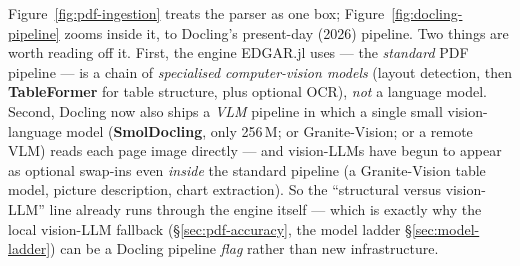 \documentclass[11pt,a4paper]{report}
\begin{document}
Figure~\ref{fig:pdf-ingestion} treats the parser as one box; Figure~\ref{fig:docling-pipeline} zooms inside it,
to Docling's present-day (2026) pipeline. Two things are worth reading off it. First, the engine EDGAR.jl uses
--- the \emph{standard} PDF pipeline --- is a chain of \emph{specialised computer-vision models} (layout
detection, then \textbf{TableFormer} for table structure, plus optional OCR), \emph{not} a language model.
Second, Docling now also ships a \emph{VLM} pipeline in which a single small vision-language model
(\textbf{SmolDocling}, only 256\,M; or Granite-Vision; or a remote VLM) reads each page image directly --- and
vision-LLMs have begun to appear as optional swap-ins even \emph{inside} the standard pipeline (a
Granite-Vision table model, picture description, chart extraction). So the ``structural versus vision-LLM''
line already runs through the engine itself --- which is exactly why the local vision-LLM fallback
(\S\ref{sec:pdf-accuracy}, the model ladder \S\ref{sec:model-ladder}) can be a Docling pipeline \emph{flag}
rather than new infrastructure.
\end{document}
